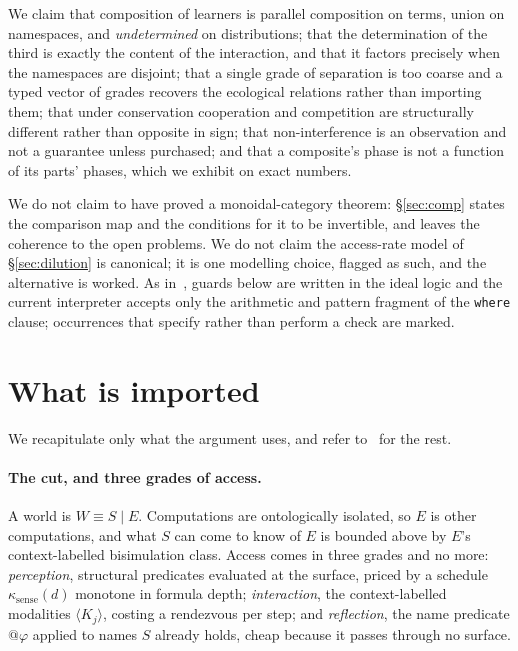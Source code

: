 \documentclass[11pt,a4paper]{article}
\theoremstyle{plain}
\theoremstyle{definition}
\theoremstyle{remark}
\begin{document}
We claim that composition of learners is parallel composition on terms, union on namespaces, and
\emph{undetermined} on distributions; that the determination of the third is exactly the content
of the interaction, and that it factors precisely when the namespaces are disjoint; that a single
grade of separation is too coarse and a typed vector of grades recovers the ecological relations
rather than importing them; that under conservation cooperation and competition are structurally
different rather than opposite in sign; that non-interference is an observation and not a
guarantee unless purchased; and that a composite's phase is not a function of its parts' phases,
which we exhibit on exact numbers.

We do not claim to have proved a monoidal-category theorem: \S\ref{sec:comp} states the
comparison map and the conditions for it to be invertible, and leaves the coherence to the
open problems. We do not claim the access-rate model of \S\ref{sec:dilution} is canonical; it is
one modelling choice, flagged as such, and the alternative is worked. As in~\cite{game}, guards
below are written in the ideal logic and the current interpreter accepts only the arithmetic and
pattern fragment of the \texttt{where} clause; occurrences that specify rather than perform a
check are marked.

\section{What is imported}

We recapitulate only what the argument uses, and refer to~\cite{scientist,game,classifier} for
the rest.

\paragraph{The cut, and three grades of access.}
A world is $W \equiv S \mid E$. Computations are ontologically isolated, so $E$ is other
computations, and what $S$ can come to know of $E$ is bounded above by $E$'s context-labelled
bisimulation class. Access comes in three grades and no more: \emph{perception}, structural
predicates evaluated at the surface, priced by a schedule $\kappa_{\mathrm{sense}}(d)$ monotone
in formula depth; \emph{interaction}, the context-labelled modalities $\langle K_j\rangle$,
costing a rendezvous per step; and \emph{reflection}, the name predicate $@\varphi$ applied to
names $S$ already holds, cheap because it passes through no surface.
\end{document}
